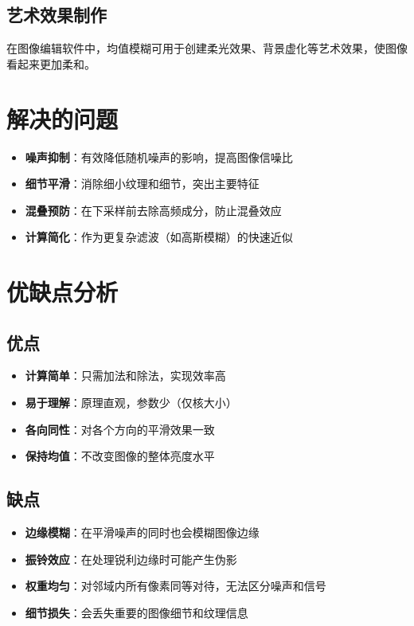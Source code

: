 \documentclass{article}
\begin{document}
\subsection{艺术效果制作}
在图像编辑软件中，均值模糊可用于创建柔光效果、背景虚化等艺术效果，使图像看起来更加柔和。

\section{解决的问题}

\begin{itemize}
    \item \textbf{噪声抑制}：有效降低随机噪声的影响，提高图像信噪比
    \item \textbf{细节平滑}：消除细小纹理和细节，突出主要特征
    \item \textbf{混叠预防}：在下采样前去除高频成分，防止混叠效应
    \item \textbf{计算简化}：作为更复杂滤波（如高斯模糊）的快速近似
\end{itemize}

\section{优缺点分析}

\subsection{优点}
\begin{itemize}
    \item \textbf{计算简单}：只需加法和除法，实现效率高
    \item \textbf{易于理解}：原理直观，参数少（仅核大小）
    \item \textbf{各向同性}：对各个方向的平滑效果一致
    \item \textbf{保持均值}：不改变图像的整体亮度水平
\end{itemize}

\subsection{缺点}
\begin{itemize}
    \item \textbf{边缘模糊}：在平滑噪声的同时也会模糊图像边缘
    \item \textbf{振铃效应}：在处理锐利边缘时可能产生伪影
    \item \textbf{权重均匀}：对邻域内所有像素同等对待，无法区分噪声和信号
    \item \textbf{细节损失}：会丢失重要的图像细节和纹理信息
\end{itemize}
\end{document}
